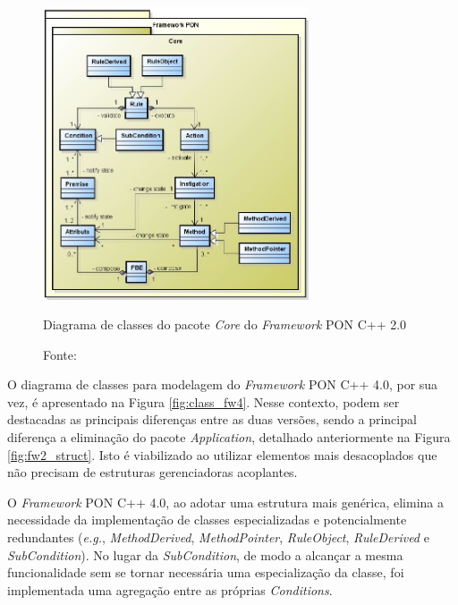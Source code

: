 \begin{figure}[!htb]
    \centering
    \includegraphics[width=0.7\textwidth]{../figures/fw2_core.PNG}
    \smallskip
    \caption{Diagrama de classes do pacote \textit{Core} do \textit{Framework}
        PON C++ 2.0} \caption*{Fonte: }
    \label{fig:class_fw2_core}
\end{figure}



O diagrama de classes para modelagem do \textit{Framework} PON C++ 4.0, por sua
vez, é apresentado na Figura \ref{fig:class_fw4}. Nesse contexto, podem
ser destacadas as principais diferenças entre as duas versões, sendo a principal
diferença a eliminação do pacote \textit{Application}, detalhado anteriormente
na Figura \ref{fig:fw2_struct}. Isto é viabilizado ao utilizar elementos
mais desacoplados que não precisam de estruturas gerenciadoras acoplantes.

O \textit{Framework} PON C++ 4.0, ao adotar uma estrutura mais genérica, elimina
a necessidade da implementação de classes especializadas e potencialmente
redundantes (\textit{e.g.}, \textit{MethodDerived}, \textit{MethodPointer},
\textit{RuleObject}, \textit{RuleDerived} e \textit{SubCondition}). No lugar da
\textit{SubCondition}, de modo a alcançar a mesma funcionalidade sem se tornar
necessária uma especialização da classe, foi implementada uma agregação entre as
próprias \textit{Conditions}.

